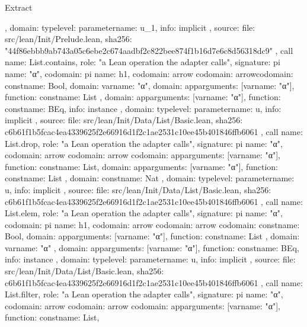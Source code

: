\begin{lexlean}{Extract}
\begin{toolingmodule}
{{{{        },
        domain: type{level: parameter{name: u_1}},
        info: implicit
      },
      source: {
        file: src/lean/Init/Prelude.lean,
        sha256: "44f86ebbb9ab743a05c6ebe2c674aadbf2c822bee874f1b16d7e6c8d56318dc9"
      }
    },
    call{
      name: List.contains,
      role: "a Lean operation the adapter calls",
      signature: pi{
        name: "α",
        codomain: pi{
          name: h1,
          codomain: arrow{
            codomain: arrow{codomain: const{name: Bool}, domain: var{name: "α"}},
            domain: app{arguments: [var{name: "α"}], function: const{name: List}}
          },
          domain: app{arguments: [var{name: "α"}], function: const{name: BEq}},
          info: instance
        },
        domain: type{level: parameter{name: u}},
        info: implicit
      },
      source: {
        file: src/lean/Init/Data/List/Basic.lean,
        sha256: c6b61f1b5fcac4ea4339625f2e66916d1f2c1ae2531c10ee45b401846ffb6061
      }
    },
    call{
      name: List.drop,
      role: "a Lean operation the adapter calls",
      signature: pi{
        name: "α",
        codomain: arrow{
          codomain: arrow{
            codomain: app{arguments: [var{name: "α"}], function: const{name: List}},
            domain: app{arguments: [var{name: "α"}], function: const{name: List}}
          },
          domain: const{name: Nat}
        },
        domain: type{level: parameter{name: u}},
        info: implicit
      },
      source: {
        file: src/lean/Init/Data/List/Basic.lean,
        sha256: c6b61f1b5fcac4ea4339625f2e66916d1f2c1ae2531c10ee45b401846ffb6061
      }
    },
    call{
      name: List.elem,
      role: "a Lean operation the adapter calls",
      signature: pi{
        name: "α",
        codomain: pi{
          name: h1,
          codomain: arrow{
            codomain: arrow{
              codomain: const{name: Bool},
              domain: app{arguments: [var{name: "α"}], function: const{name: List}}
            },
            domain: var{name: "α"}
          },
          domain: app{arguments: [var{name: "α"}], function: const{name: BEq}},
          info: instance
        },
        domain: type{level: parameter{name: u}},
        info: implicit
      },
      source: {
        file: src/lean/Init/Data/List/Basic.lean,
        sha256: c6b61f1b5fcac4ea4339625f2e66916d1f2c1ae2531c10ee45b401846ffb6061
      }
    },
    call{
      name: List.filter,
      role: "a Lean operation the adapter calls",
      signature: pi{
        name: "α",
        codomain: arrow{
          codomain: arrow{
            codomain: app{arguments: [var{name: "α"}], function: const{name: List}},
}}}}}
\end{toolingmodule}
\end{lexlean}
